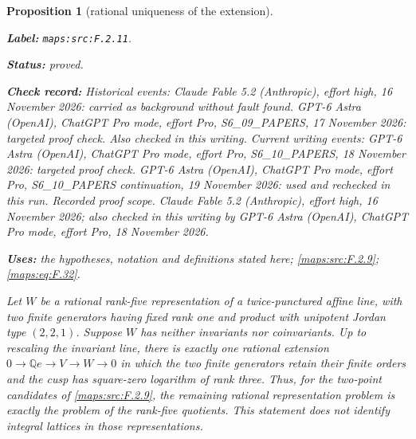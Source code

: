 \documentclass[11pt,a4paper]{article}
\newtheorem{proposition}[proposition]{Proposition}
\theoremstyle{definition}
\newcommand{\StatementRecord}[4]{\par\smallskip\begingroup\upshape\raggedright\noindent\textbf{Label:} \nolinkurl{#1}.\par\noindent\textbf{Status:} #2.\par\noindent\textbf{Check record:} #3.\par\noindent\textbf{Uses:} #4.\par\endgroup\smallskip}
\begin{document}
\begin{proposition}[rational uniqueness of the extension]\label{maps:src:F.2.11}
\StatementRecord{maps:src:F.2.11}{proved}{Historical events: Claude Fable 5.2 (Anthropic), effort high, 16 November 2026: carried as background without fault found. GPT-6 Astra (OpenAI), ChatGPT Pro mode, effort Pro, S6\_09\_PAPERS, 17 November 2026: targeted proof check. Also checked in this writing. Current writing events: GPT-6 Astra (OpenAI), ChatGPT Pro mode, effort Pro, S6\_10\_PAPERS, 18 November 2026: targeted proof check. GPT-6 Astra (OpenAI), ChatGPT Pro mode, effort Pro, S6\_10\_PAPERS continuation, 19 November 2026: used and rechecked in this run. \emph{Recorded proof scope.} Claude Fable 5.2 (Anthropic), effort high, 16 November 2026; also checked in this writing by GPT-6 Astra (OpenAI), ChatGPT Pro mode, effort Pro, 18 November 2026}{the hypotheses, notation and definitions stated here; \cref{maps:src:F.2.9}; \cref{maps:eq:F.32}}


Let $W$ be a rational rank-five representation of a
twice-punctured affine line, with two finite generators
having fixed rank one and product with unipotent Jordan type
$(2,2,1)$.  Suppose $W$ has neither invariants nor
coinvariants.  Up to rescaling the invariant line, there is
exactly one rational extension
$0\to\mathbb Qe\to V\to W\to0$ in which the two finite
generators retain their finite orders and the cusp has
square-zero logarithm of rank three.  Thus, for the
two-point candidates of \ref{maps:src:F.2.9}, the remaining rational
representation problem is exactly the problem of the
rank-five quotients.  This statement does not identify
integral lattices in those representations.

\end{proposition}
\end{document}
